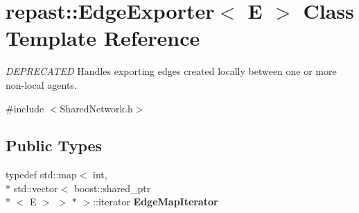 \hypertarget{classrepast_1_1_edge_exporter}{\section{repast\-:\-:Edge\-Exporter$<$ E $>$ Class Template Reference}
\label{classrepast_1_1_edge_exporter}
}


{\itshape D\-E\-P\-R\-E\-C\-A\-T\-E\-D} Handles exporting edges created locally between one or more non-\/local agents.  




{\ttfamily \#include $<$Shared\-Network.\-h$>$}

\subsection*{Public Types}
\begin{DoxyCompactItemize}
\item 
\hypertarget{classrepast_1_1_edge_exporter_a035179ca3839797ba3b3dec950e5f029}{typedef std\-::map$<$ int, \\*
std\-::vector$<$ boost\-::shared\-\_\-ptr\\*
$<$ E $>$ $>$ $\ast$ $>$\-::iterator {\bfseries Edge\-Map\-Iterator}}\label{classrepast_1_1_edge_exporter_a035179ca3839797ba3b3dec950e5f029}

\end{DoxyCompactItemize}

